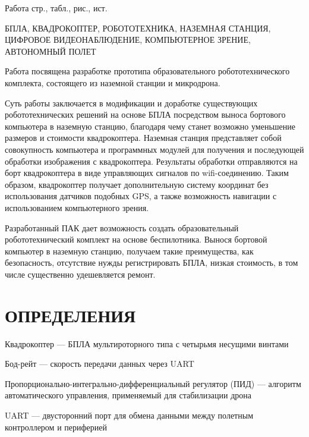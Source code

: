 \documentclass[a4paper,12pt]{article}
\begin{document}
\thispagestyle{empty} %

Работа  стр.,  табл.,  рис., \totalmycitecounts ист. 

БПЛА, КВАДРОКОПТЕР, РОБОТОТЕХНИКА, НАЗЕМНАЯ СТАНЦИЯ, ЦИФРОВОЕ ВИДЕОНАБЛЮДЕНИЕ, КОМПЬЮТЕРНОЕ ЗРЕНИЕ, АВТОНОМНЫЙ ПОЛЕТ

Работа посвящена разработке прототипа образовательного робототехнического комплекта, состоящего из наземной станции и микродрона.

Суть работы заключается в модификации и доработке существующих робототехнических решений на основе БПЛА посредством выноса бортового компьютера в наземную станцию, благодаря чему станет возможно уменьшение размеров и стоимости квадрокоптера.
Наземная станция представляет собой совокупность компьютера и программных модулей для получения и последующей обработки изображения с квадрокоптера. Результаты обработки отправляются на борт квадрокоптера в виде управляющих сигналов по wifi-соединению.
Таким образом, квадрокоптер получает дополнительную систему координат без использования датчиков подобных GPS, а также возможность навигации с использованием компьютерного зрения.

Разработанный ПАК дает возможность создать образовательный робототехнический комплект на основе беспилотника. Вынося бортовой компьютер в наземную станцию, получаем такие преимущества, как безопасность, отсутствие нужды регистрировать БПЛА, низкая стоимость, в том числе существенно удешевляется ремонт.

\pagebreak
\thispagestyle{empty}

\section*{\centering ОПРЕДЕЛЕНИЯ}

\thispagestyle{empty} %

Квадрокоптер --- БПЛА мультироторного типа с четырьмя несущими винтами

Бод-рейт --- скорость передачи данных через UART

Пропорционально-интегрально-дифференциальный регулятор (ПИД) --- алгоритм автоматического управления, применяемый для стабилизации дрона

UART --- двусторонний порт для обмена данными между полетным контроллером и периферией

\pagebreak
\thispagestyle{empty}
\end{document}
